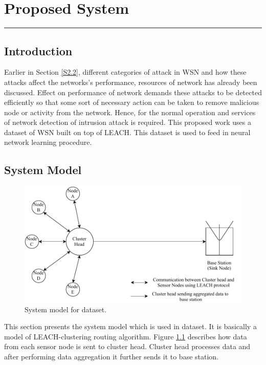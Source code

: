 \chapter{Proposed System}
\label{C5} %
\graphicspath{{Figures/PDF}}
\noindent\rule{\linewidth}{2pt}
\section{Introduction} \label{S5.1}
Earlier in Section \ref{S2.2}, different categories of attack in WSN and how these attacks affect the networks's performance, resources of network has already been discussed. Effect on performance of network demands these attacks to be detected efficiently so that some sort of necessary action can be taken to remove malicious node or activity from the network. Hence, for the normal operation and services of network detection of intrusion attack is required. This proposed work uses a dataset of WSN built on top of LEACH. This dataset is used to feed in neural network learning procedure.
\section{System Model} \label{S5.2}
    \begin{figure}[h]
    \center	
    \includegraphics[scale=0.9]{Figures/PDF/SystemModel.pdf}
    \caption{System model for dataset.}
    \label{SystemModel}	
    \end{figure}
This section presents the system model which is used in dataset. It is basically a model of LEACH-clustering routing algorithm. Figure \ref{SystemModel} describes how data from each sensor node is sent to cluster head. Cluster head processes data and after performing data aggregation it further sends it to base station.

